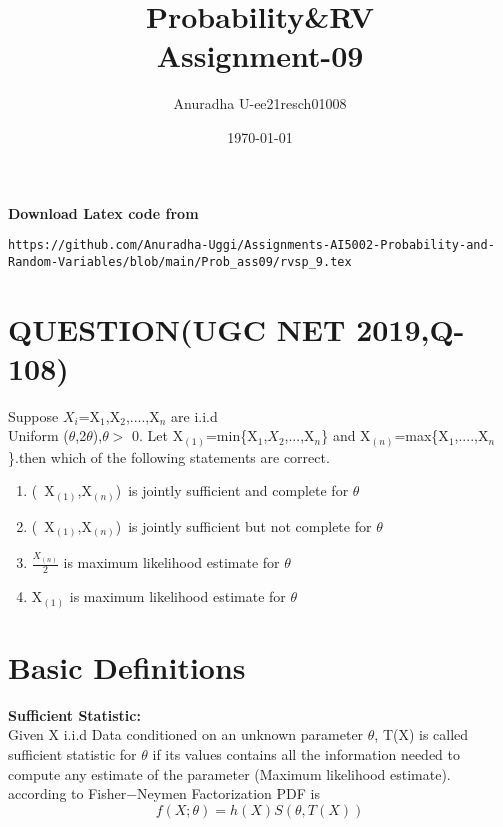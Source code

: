 \documentclass[journal,12pt,twocolumn]{IEEEtran}
\title{Probability\&RV \\ Assignment-09}
\author{Anuradha U-ee21resch01008}
\date{\today}
\begin{document}
\maketitle
\newpage
\bigskip
\renewcommand{\thefigure}{\theenumi}
\renewcommand{\thetable}{\theenumi}


\textbf{Download Latex code from}
\begin{lstlisting}
https://github.com/Anuradha-Uggi/Assignments-AI5002-Probability-and-Random-Variables/blob/main/Prob_ass09/rvsp_9.tex
\end{lstlisting}
\section{\textbf{QUESTION(UGC NET 2019,Q-108)}}

Suppose $X_i$=X$_1$,X$_2$,....,X$_n$ are i.i.d \\ Uniform ($\theta$,2$\theta$),$\theta>$ 0. Let X$_{(1)}$=min\{X$_1$,$X_2$,...,X$_n$\} and 
X$_{(n)}$=max\{X$_1$,....,X$_n$\}.then which of the following statements are correct.\\

\begin{enumerate}
    \item (\ X$_{(1)}$,X$_{(n)}$)\ is jointly sufficient and complete for $\theta$
    \item (\ X$_{(1)}$,X$_{(n)}$)\ is jointly sufficient but not complete for
    $\theta$
    \item $\frac{X_{(n)}}{2}$ is maximum likelihood estimate for $\theta$
    \item X$_{(1)}$ is maximum likelihood estimate for $\theta$
    
\end{enumerate}
\section{\textbf{Basic Definitions}}
\textbf{Sufficient Statistic:}\\

Given X i.i.d Data conditioned on an unknown parameter $\theta$, T(X) is called sufficient statistic for $\theta$ if its values contains all the information needed to compute any estimate of the parameter (Maximum likelihood estimate). according to Fisher$-$Neymen Factorization PDF is \\

\begin{equation}
    f(X;\theta)=h(X)S(\theta,T(X))
\end{equation}
\end{document}
